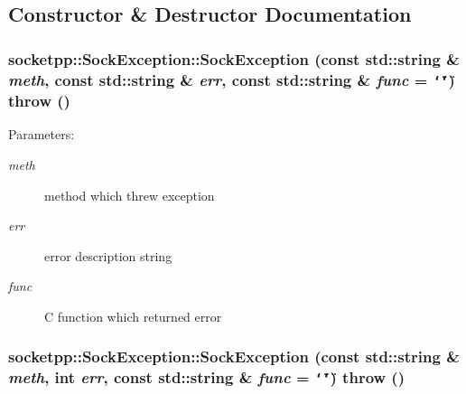 \subsection{Constructor \& Destructor Documentation}
\hypertarget{classsocketpp_1_1SockException_ea2b065bb1b5c6bf062b6a9d7574853f}{
\subsubsection[{SockException}]{\setlength{\rightskip}{0pt plus 5cm}socketpp::SockException::SockException (const std::string \& {\em meth}, \/  const std::string \& {\em err}, \/  const std::string \& {\em func} = {\tt \char`\"{}\char`\"{}})  throw ()}}
\label{classsocketpp_1_1SockException_ea2b065bb1b5c6bf062b6a9d7574853f}


\begin{Desc}
\item[Parameters:]
\begin{description}
\item[{\em meth}]method which threw exception \item[{\em err}]error description string \item[{\em func}]C function which returned error \end{description}
\end{Desc}
\hypertarget{classsocketpp_1_1SockException_b83e8ced6e6fa142711d0a49e3e70ba0}{
\subsubsection[{SockException}]{\setlength{\rightskip}{0pt plus 5cm}socketpp::SockException::SockException (const std::string \& {\em meth}, \/  int {\em err}, \/  const std::string \& {\em func} = {\tt \char`\"{}\char`\"{}})  throw ()}}
\label{classsocketpp_1_1SockException_b83e8ced6e6fa142711d0a49e3e70ba0}


